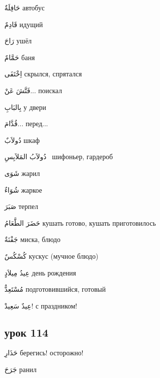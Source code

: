 \documentclass[a5paper]{article}
\newcommand\textstyleDropCaps[1]{#1}
\newcommand\textstyleCaptioncharacters[1]{#1}
\begin{document}
\textstyleCaptioncharacters{حَافِلَةٌ }\textstyleDropCaps{автобус‎}

\textstyleCaptioncharacters{قَادِمٌ }\textstyleDropCaps{идущий‎}

\textstyleCaptioncharacters{رَاحَ }\textstyleDropCaps{ушёл‎}

\textstyleCaptioncharacters{حَمَّامٌ }\textstyleDropCaps{баня‎}

\textstyleCaptioncharacters{اِخْتَفَى }\textstyleDropCaps{скрылся, спрятал­ся‎}

\textstyleCaptioncharacters{فَتَّشَ عَنْ... }\textstyleDropCaps{поискал‎}

\textstyleCaptioncharacters{بِالبَابِ }\textstyleDropCaps{у двери‎}

\textstyleCaptioncharacters{قُدَّامَ... }\textstyleDropCaps{перед...‎}

\textstyleCaptioncharacters{دُولاَبٌ }\textstyleDropCaps{шкаф‎}

\textstyleCaptioncharacters{دُولاَبُ المَلاَبِسِ \ }\textstyleDropCaps{ши­фоньер, гардероб‎}

\textstyleCaptioncharacters{شَوَى }\textstyleDropCaps{жарил ‎}

\textstyleCaptioncharacters{شُوَاءٌ }\textstyleDropCaps{жаркое‎}

\textstyleCaptioncharacters{صَبَرَ }\textstyleDropCaps{терпел‎}

\textstyleCaptioncharacters{حَضَرَ الطَّعَامُ }\textstyleDropCaps{кушать го­тово, кушать приготовилось‎}

\textstyleCaptioncharacters{جَفْنَةٌ }\textstyleDropCaps{миска, блюдо‎}

\textstyleCaptioncharacters{كُسْكُسٌ }\textstyleDropCaps{кускус (мучное блюдо)‎}

\textstyleCaptioncharacters{عِيدُ مِيلاَدٍ }\textstyleDropCaps{день рожде­ния‎}

\textstyleCaptioncharacters{مُسْتَعِدٌّ }\textstyleDropCaps{подготовивший­ся, готовый‎}

\textstyleCaptioncharacters{عِيدٌ سَعِيدْ! }\textstyleDropCaps{с праздни­ком!‎}

\subsection[урок 114‎]{\textstyleDropCaps{урок 114‎}}
\textstyleCaptioncharacters{حَذَارِ }\textstyleDropCaps{берегись! осторож­но!‎}

\textstyleCaptioncharacters{جَرَحَ }\textstyleDropCaps{ранил‎}
\end{document}
